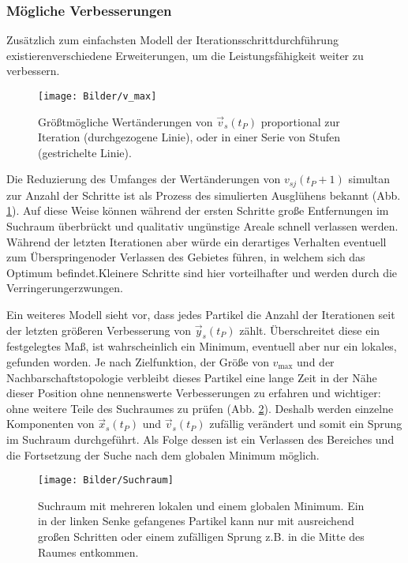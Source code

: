 \subsubsection{Mögliche Verbesserungen}
  Zusätzlich zum einfachsten Modell der Iterationsschrittdurchführung existieren\linebreak verschiedene Erweiterungen, um die Leistungsfähigkeit weiter zu verbessern.
  
  \begin{figure}[!b]
    \centering
    \texttt{[image: Bilder/v\_max]}
    \caption{Größtmögliche Wertänderungen von $\vec{v}_s(t_P)$ proportional zur Iteration (durchgezogene Linie), oder in einer Serie von Stufen (gestrichelte Linie).}
    \label{Iter_v_max}
  \end{figure}  
  Die Reduzierung des Umfanges der Wertänderungen von $v_{sj}(t_P+1)$ simultan zur Anzahl der Schritte ist als Prozess des simulierten Ausglühens bekannt (Abb. \ref{Iter_v_max}). Auf diese Weise können während der ersten Schritte große Entfernungen im Suchraum überbrückt und qualitativ ungünstige Areale schnell verlassen werden. Während der letzten Iterationen aber würde ein derartiges Verhalten eventuell zum Überspringen\linebreak oder Verlassen des Gebietes führen, in welchem sich das Optimum befindet.\linebreak Kleinere Schritte sind hier vorteilhafter und werden durch die Verringerung\linebreak erzwungen. \cite{Eberhart2001}

  Ein weiteres Modell sieht vor, dass jedes Partikel die Anzahl der Iterationen seit der letzten größeren Verbesserung von $\vec{y}_s(t_P)$ zählt. Überschreitet diese ein festgelegtes Maß, ist wahrscheinlich ein Minimum, eventuell aber nur ein lokales, gefunden worden. Je nach Zielfunktion, der Größe von $v_{\textrm{max}}$ und der Nachbarschaftstopologie verbleibt dieses Partikel eine lange Zeit in der Nähe dieser Position ohne nennenswerte Verbesserungen zu erfahren und wichtiger: ohne weitere Teile des Suchraumes zu prüfen (Abb. \ref{Suchraum}). Deshalb werden einzelne Komponenten von $\vec{x}_s(t_P)$ und $\vec{v}_s(t_P)$ zufällig verändert und somit ein Sprung im Suchraum durchgeführt. Als Folge dessen ist ein Verlassen des Bereiches und die Fortsetzung der Suche nach dem globalen Minimum möglich. \cite{Ning2004}
  \begin{figure}[!b]
    \centering
    \texttt{[image: Bilder/Suchraum]}
    \caption{Suchraum mit mehreren lokalen und einem globalen Minimum. Ein in der linken Senke gefangenes Partikel kann nur mit ausreichend großen Schritten oder einem zufälligen Sprung z.B. in die Mitte des Raumes entkommen.}
    \label{Suchraum}
  \end{figure}

